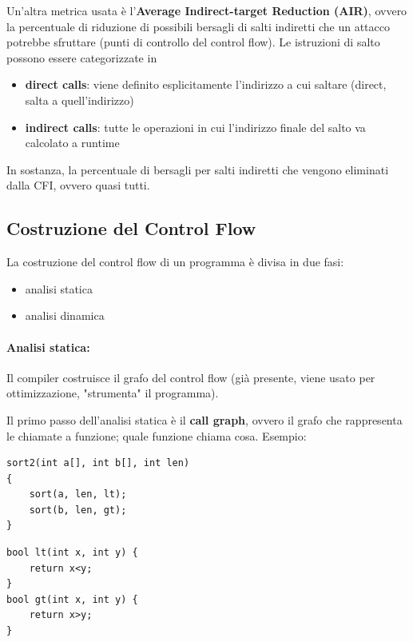 Un'altra metrica usata è l'\textbf{Average Indirect-target Reduction (AIR)}, ovvero la percentuale di riduzione di possibili bersagli di salti indiretti che un attacco potrebbe sfruttare (punti di controllo del control flow). Le istruzioni di salto possono essere categorizzate in 
\begin{itemize}
	\item \textbf{direct calls}: viene definito esplicitamente l'indirizzo a cui saltare (direct, salta a quell'indirizzo)
    
	\item \textbf{indirect calls}: tutte le operazioni in cui l'indirizzo finale del salto va calcolato a runtime
\end{itemize}
In sostanza, la percentuale di bersagli per salti indiretti che vengono eliminati dalla CFI, ovvero quasi tutti.

\subsection{Costruzione del Control Flow}

La costruzione del control flow di un programma è divisa in due fasi: 
\begin{itemize}
	\item analisi statica
    
	\item analisi dinamica
\end{itemize}

\paragraph{Analisi statica:} Il compiler costruisce il grafo del control flow (già presente, viene usato per ottimizzazione, "strumenta" il programma). 

Il primo passo dell'analisi statica è il \textbf{call graph}, ovvero il grafo che rappresenta le chiamate a funzione; quale funzione chiama cosa. Esempio: 

\begin{center}
	\begin{minipage}[h]{0.52\textwidth}
		\begin{verbatim}
sort2(int a[], int b[], int len)
{
    sort(a, len, lt);
    sort(b, len, gt);
}
		\end{verbatim}
	\end{minipage}
    \hfill 
	\begin{minipage}[h]{0.37\textwidth}
		\begin{verbatim}
bool lt(int x, int y) {
    return x<y;
}
bool gt(int x, int y) {
    return x>y;
}
		\end{verbatim}
	\end{minipage}
\end{center}

